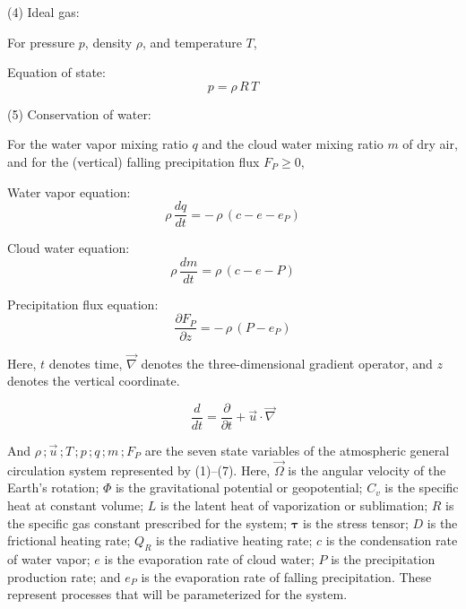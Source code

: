 \documentclass[12pt,openany]{book}
\begin{document}
(4) Ideal gas:

For pressure $p$, density $\rho$, and temperature $T$,

Equation of state:
\begin{equation}
p = \rho \, R \, T
\tag{1.4}
\label{eq:1.4}
\end{equation}

(5) Conservation of water:

For the water vapor mixing ratio $q$ and the cloud water mixing ratio
$m$ of dry air, and for the (vertical) falling precipitation flux $F_P \ge 0$,

Water vapor equation:
\begin{equation}
\rho \,\frac{dq}{dt}
= -\, \rho \,( c - e - e_P )
\tag{1.5}
\label{eq:1.5}
\end{equation}

Cloud water equation:
\begin{equation}
\rho \,\frac{dm}{dt}
= \rho \,( c - e - P )
\tag{1.6}
\label{eq:1.6}
\end{equation}

Precipitation flux equation:
\begin{equation}
\frac{\partial F_P}{\partial z}
= -\, \rho \, ( P - e_P )
\tag{1.7}
\label{eq:1.7}
\end{equation}

Here, $t$ denotes time, $\vec{\nabla}$ denotes the three-dimensional
gradient operator, and $z$ denotes the vertical coordinate.

\begin{equation}
\frac{d}{dt}
= \frac{\partial}{\partial t}
  + \vec{u} \cdot \vec{\nabla}
\tag{1.8}
\label{eq:1.8}
\end{equation}

And
$\rho \, ; \vec{u} \, ; T \, ; p \, ; q \, ; m \, ; F_P$
are the seven state variables of the atmospheric general circulation
system represented by (1)--(7).
Here, $\vec{\Omega}$ is the angular velocity of the Earth’s rotation;
$\Phi$ is the gravitational potential or geopotential;
$C_v$ is the specific heat at constant volume;
$L$ is the latent heat of vaporization or sublimation;
$R$ is the specific gas constant prescribed for the system;
$\boldsymbol{\tau}$ is the stress tensor;
$D$ is the frictional heating rate;
$Q_R$ is the radiative heating rate;
$c$ is the condensation rate of water vapor;
$e$ is the evaporation rate of cloud water;
$P$ is the precipitation production rate;
and $e_P$ is the evaporation rate of falling precipitation.
These represent processes that will be parameterized for the system.
\end{document}
